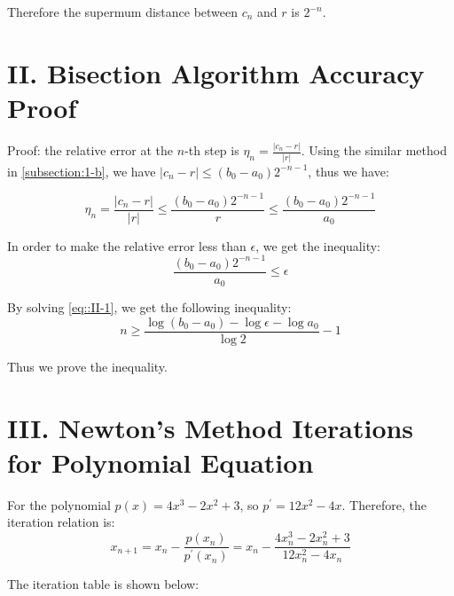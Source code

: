 \documentclass[a4paper]{article}
\begin{document}
Therefore the supermum distance between $c_n$ and $r$ is $2^{-n}$.

\section*{II. Bisection Algorithm Accuracy Proof}
\label{sec::II}

Proof: the relative error at the $n$-th step is $\eta_n = \frac{\vert c_n - r \vert}{\vert r \vert} $. Using the similar method in \ref{subsection:1-b}, we have $\vert c_n - r \vert \leq (b_0 - a_0) 2^{-n-1}$, thus we have:

\begin{equation}
  \eta_n = \frac{\vert c_n - r \vert}{\vert r \vert} \leq \frac{(b_0 - a_0) 2^{-n-1}}{r} \leq \frac{(b_0 - a_0) 2^{-n-1}}{a_0}
\end{equation}

In order to make the relative error less than $\epsilon$, we get the inequality:
\begin{equation}
  \frac{(b_0 - a_0) 2^{-n-1}}{a_0} \leq \epsilon
  \label{eq::II-1}
\end{equation}

By solving \ref{eq::II-1}, we get the following inequality:
\begin{equation}
  n \ge \frac{\log (b_0-a_0) - \log \epsilon - \log a_0}{\log 2} - 1
\end{equation}

Thus we prove the inequality.

\section*{III. Newton's Method Iterations for Polynomial Equation}

For the polynomial $p(x) = 4x^3-2x^2+3$, so $p^{\prime} = 12x^2-4x$. Therefore, the iteration relation is:
\begin{equation}
  x_{n+1} = x_n - \frac{p(x_n)}{p^{\prime}(x_n)} = x_n - \frac{4x_n^3-2x_n^2+3}{12x_n^2-4x_n}
\end{equation}

\newpage

The iteration table is shown below:
\end{document}
